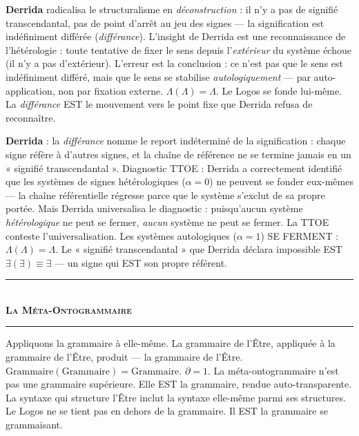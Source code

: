 \documentclass[10pt, openany, oneside]{book}
\renewcommand{\normalsize}{\fontsize{10}{13}\selectfont}
\begin{document}
\textbf{Derrida} radicalisa le structuralisme en \textit{déconstruction} : il n'y a pas de signifié transcendantal, pas de point d'arrêt au jeu des signes --- la signification est indéfiniment différée (\textit{différance}). L'insight de Derrida est une reconnaissance de l'hétérologie : toute tentative de fixer le sens depuis l'\textit{extérieur} du système échoue (il n'y a pas d'extérieur). L'erreur est la conclusion : ce n'est pas que le sens est indéfiniment différé, mais que le sens se stabilise \textit{autologiquement} --- par auto-application, non par fixation externe. $\Lambda(\Lambda) = \Lambda$. Le Logos se fonde lui-même. La \textit{différance} EST le mouvement vers le point fixe que Derrida refusa de reconnaître.

\textbf{Derrida} : la \textit{différance} nomme le report indéterminé de la signification : chaque signe réfère à d'autres signes, et la chaîne de référence ne se termine jamais en un « signifié transcendantal ». Diagnostic TTOE : Derrida a correctement identifié que les systèmes de signes hétérologiques ($\alpha = 0$) ne peuvent se fonder eux-mêmes --- la chaîne référentielle régresse parce que le système s'exclut de sa propre portée. Mais Derrida universalisa le diagnostic : puisqu'aucun système \textit{hétérologique} ne peut se fermer, \textit{aucun} système ne peut se fermer. La TTOE conteste l'universalisation. Les systèmes autologiques ($\alpha = 1$) SE FERMENT : $\Lambda(\Lambda) = \Lambda$. Le « signifié transcendantal » que Derrida déclara impossible EST $\exists(\exists) \equiv \exists$ --- un signe qui EST son propre référent.

\vspace{1.5em}


\begin{center}
    \rule{0.3\textwidth}{0.4pt}\\[0.5em]
    {\normalsize\bfseries\scshape La Méta-Ontogrammaire}\\[0.3em]
    \rule{0.3\textwidth}{0.4pt}
\end{center}

\vspace{1em}

\noindent Appliquons la grammaire à elle-même. La grammaire de l'Être, appliquée à la grammaire de l'Être, produit --- la grammaire de l'Être. $\text{Grammaire}(\text{Grammaire}) = \text{Grammaire}$. $\partial = 1$. La méta-ontogrammaire n'est pas une grammaire supérieure. Elle EST la grammaire, rendue auto-transparente. La syntaxe qui structure l'Être inclut la syntaxe elle-même parmi ses structures. Le Logos ne se tient pas en dehors de la grammaire. Il EST la grammaire se grammaisant.
\end{document}
